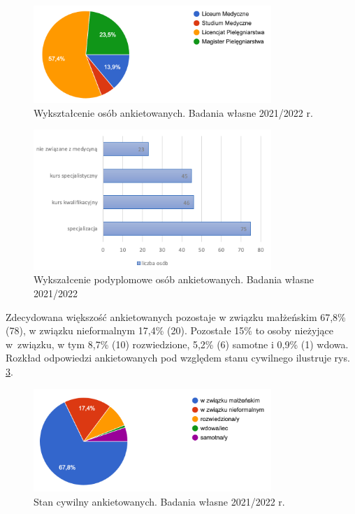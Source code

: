 \documentclass[a4paper,12pt,twoside,openright]{mwrep}
\begin{document}
\begin{figure}[H]
\centering
\includegraphics[width=9cm]{char_gr_bad/wyksztalc00}
\caption{Wykształcenie osób ankietowanych. Badania własne 2021/2022 r.}
\label{rys:wykszt}
\end{figure}

\begin{figure}[H]
\centering
\includegraphics[width=9cm]{char_gr_bad/podyplom01}
\caption{Wykszałcenie podyplomowe osób ankietowanych. Badania własne 2021/2022}
\label{rys:podyplom}
\end{figure}


Zdecydowana większość ankietowanych pozostaje w związku małżeńskim 67,8\%  (78), w związku nieformalnym 17,4\% (20). Pozostałe 15\% to osoby nieżyjące w~związku, w tym  8,7\% (10) rozwiedzione,  5,2\% (6) samotne i 0,9\%  (1) wdowa. Rozkład odpowiedzi ankietowanych pod względem stanu cywilnego ilustruje rys. \ref{rys:cywil}.

\begin{figure}[H]
\centering
\includegraphics[width=9cm]{char_gr_bad/cyw00}
\caption{Stan cywilny ankietowanych. Badania własne 2021/2022 r.}
\label{rys:cywil}
\end{figure}
\end{document}
